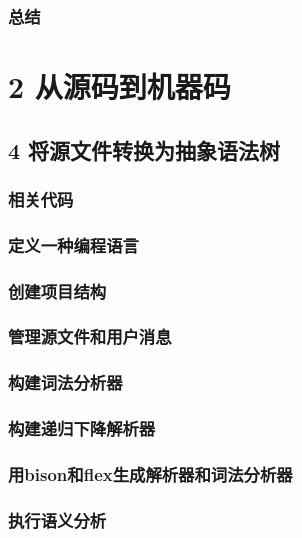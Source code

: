 \documentclass[11pt,a4paper,UTF8]{ctexart}
\begin{document}
		\subsubsection*{ 总结}
		
    \pagecolor{mygray}
    \color{white}
	\section*{ 2 从源码到机器码}
	\color{black}
	\pagecolor{white}
	
	\subsection{4 将源文件转换为抽象语法树}
		\subsubsection{相关代码}
		\subsubsection{定义一种编程语言}
		\subsubsection{创建项目结构}
		\subsubsection{管理源文件和用户消息}
		\subsubsection{构建词法分析器}
		\subsubsection{构建递归下降解析器}
		\subsubsection{用bison和flex生成解析器和词法分析器}
		\subsubsection{执行语义分析}
\end{document}
